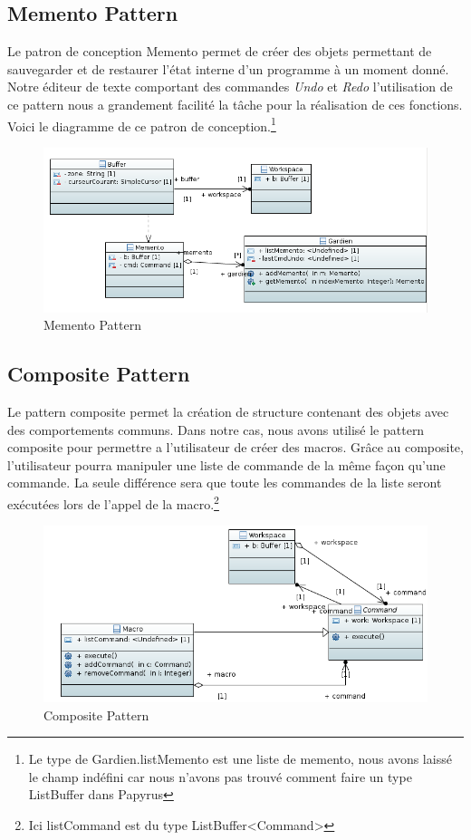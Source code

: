 \documentclass[11pt,a4paper,oldfontcommands]{memoir}
\begin{document}
\subsection{Memento Pattern}
Le patron de conception Memento permet de créer des objets permettant de sauvegarder et de restaurer l'état interne d'un programme à un moment donné.
Notre éditeur de texte comportant des commandes \emph{Undo} et \emph{Redo} l'utilisation de ce pattern nous a grandement facilité la tâche pour la réalisation de ces fonctions. Voici le diagramme de ce patron de conception.\footnote{Le type de Gardien.listMemento est une liste de memento, nous avons laissé le champ indéfini car nous n'avons pas trouvé comment faire un type ListBuffer dans Papyrus}
\begin{figure}[!ht]
\centering 
\includegraphics[width=13cm]{MementoPattern.png}
\caption{Memento Pattern}
\label{figure3}
\end{figure}
\subsection{Composite Pattern}
Le pattern composite permet la création de structure contenant des objets avec des comportements communs. Dans notre cas, nous avons utilisé le pattern composite pour permettre a l'utilisateur de créer des macros. Grâce au composite, l'utilisateur pourra manipuler une liste de commande de la même façon qu'une commande. La seule différence sera que toute les commandes de la liste seront exécutées lors de l'appel de la macro.\footnote{Ici listCommand est du type ListBuffer<Command>}
\begin{figure}[!ht]
\centering 
\includegraphics[width=13cm]{CompositePattern.png}
\caption{Composite Pattern }
\label{figure4}
\end{figure}
\end{document}
